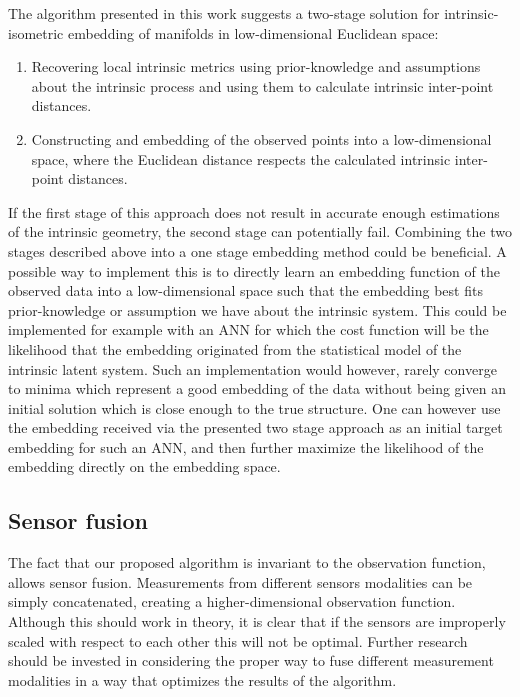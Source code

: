 	The algorithm presented in this work suggests a two-stage solution
	for intrinsic-isometric embedding of manifolds in low-dimensional
	Euclidean space:
	\begin{enumerate}
		\item Recovering local intrinsic metrics using prior-knowledge and assumptions
		about the intrinsic process and using them to calculate intrinsic
		inter-point distances.
		\item Constructing and embedding of the observed points into a low-dimensional
		space, where the Euclidean distance respects the calculated intrinsic
		inter-point distances.
	\end{enumerate}
	If the first stage of this approach does not result in accurate enough
	estimations of the intrinsic geometry, the second stage can potentially
	fail. Combining the two stages described above into a one stage embedding
	method could be beneficial. A possible way to implement this is to
	directly learn an embedding function of the observed data into a low-dimensional
	space such that the embedding best fits prior-knowledge or assumption
	we have about the intrinsic system. This could be implemented for
	example with an \ac{ANN} for which the cost function will be the
	likelihood that the embedding originated from the statistical model
	of the intrinsic latent system. Such an implementation would however,
	rarely converge to minima which represent a good embedding of the
	data without being given an initial solution which is close enough
	to the true structure. One can however use the embedding received
	via the presented two stage approach as an initial target embedding
	for such an \ac{ANN}, and then further maximize the likelihood of
	the embedding directly on the embedding space. 
	
	\subsection{Sensor fusion}
	
	The fact that our proposed algorithm is invariant to the observation
	function, allows sensor fusion. Measurements from different sensors
	modalities can be simply concatenated, creating a higher-dimensional
	observation function. Although this should work in theory, it is clear
	that if the sensors are improperly scaled with respect to each other
	this will not be optimal. Further research should be invested in considering
	the proper way to fuse different measurement modalities in a way that
	optimizes the results of the algorithm. 
	

